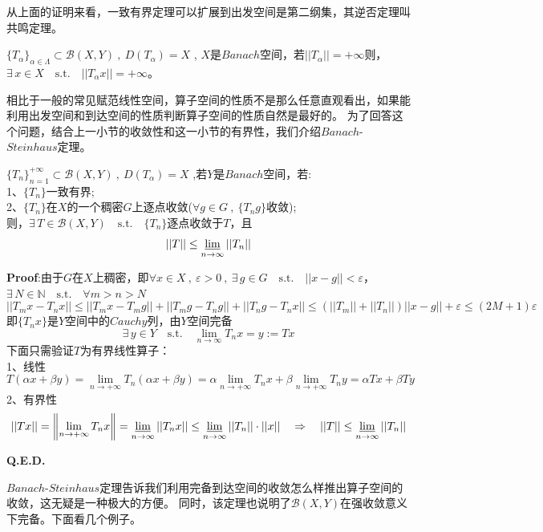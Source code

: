 从上面的证明来看，一致有界定理可以扩展到出发空间是第二纲集，其逆否定理叫共鸣定理。
\begin{theorem}[共鸣定理]
    $\{T_{\alpha}\}_{\alpha \in \Lambda} \subset \mathscr{B}(X,Y) \ , \ D(T_{\alpha})=X$ , $X$是$Banach$空间，若$||T_{\alpha}||=+\infty$则，$\exists \, x \in X \quad \text{s.t.} \quad ||T_{\alpha}x||=+\infty$。
\end{theorem} 
相比于一般的常见赋范线性空间，算子空间的性质不是那么任意直观看出，如果能利用出发空间和到达空间的性质判断算子空间的性质自然是最好的。
为了回答这个问题，结合上一小节的收敛性和这一小节的有界性，我们介绍$Banach$-$Steinhaus$定理。
\begin{theorem}\label{BS}
    $\{T_n\}_{n=1}^{+\infty} \subset \mathscr{B}(X,Y) \ , \ D(T_{\alpha})=X$ ,若$Y$是$Banach$空间，若:\\
    1、$\{T_n\}$一致有界;\\
    2、$\{T_n\}$在$X$的一个稠密$G$上逐点收敛($\forall g \in G \ , \ \{T_ng\}$收敛);\\
    则，$\exists \, T \in \mathscr{B}(X,Y) \quad \text{s.t.} \quad \{T_n\}$逐点收敛于$T$，且
    \[||T|| \leq \varliminf\limits_{n\to\infty}||T_n||\]
\end{theorem} 
\textbf{Proof}:由于$G$在$X$上稠密，即$\forall x \in X \ , \ \varepsilon>0\ , \ \exists \, g \in G \quad \text{s.t.} \quad ||x-g||<\varepsilon$，$\exists \, N \in \mathbb{N} \quad \text{s.t.} \quad \forall m>n>N$
\[||T_mx-T_nx|| \leq ||T_mx-T_mg||+||T_mg-T_ng||+||T_ng-T_nx|| \leq \left(||T_m||+||T_n||\right)||x-g||+\varepsilon \leq (2M+1)\varepsilon\]
即$\{T_nx\}$是$Y$空间中的$Cauchy$列，由$Y$空间完备
\[\exists \, y \in Y \quad \text{s.t.} \quad \lim_{n \to \infty}T_nx=y:=Tx\]
下面只需验证$T$为有界线性算子：\\
1、线性
\[T(\alpha x+\beta y)=\lim_{n \to +\infty}T_n(\alpha x+\beta y)=\alpha\lim_{n \to +\infty}T_nx+\beta\lim_{n \to +\infty}T_ny=\alpha Tx+\beta Ty\]
2、有界性
\[||Tx||=\left\|\lim_{n \to +\infty}T_nx\right\|=\varliminf\limits_{n\to\infty}||T_nx|| \leq \varliminf\limits_{n\to\infty}||T_n|| \cdot ||x|| \quad \Rightarrow \quad ||T|| \leq \varliminf\limits_{n\to\infty}||T_n||\]

\textbf{Q.E.D.}

$Banach$-$Steinhaus$定理告诉我们利用完备到达空间的收敛怎么样推出算子空间的收敛，这无疑是一种极大的方便。
同时，该定理也说明了$\mathscr{B}(X,Y)$在强收敛意义下完备。下面看几个例子。

